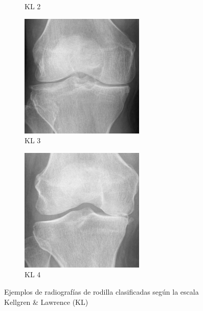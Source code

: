 \documentclass[11pt,spanish,listoffigures,listoftables]{tfgetsinf}
\begin{document}
\begin{figure}[htbp]
\begin{subfigure}[b]{0.19\textwidth}
        \caption{KL 2}
        \label{fig:knee2}
    \end{subfigure}
    \hfill
    \begin{subfigure}[b]{0.19\textwidth}
        \includegraphics[width=\textwidth]{knee_3.png}
        \caption{KL 3}
        \label{fig:knee3}
    \end{subfigure}
    \hfill
    \begin{subfigure}[b]{0.19\textwidth}
        \includegraphics[width=\textwidth]{knee_4.png}
        \caption{KL 4}
        \label{fig:knee4}
    \end{subfigure}
    \caption{Ejemplos de radiografías de rodilla clasificadas según la escala Kellgren \& Lawrence (KL)}
    \label{fig:knee-examples}
\end{figure}
\end{document}
